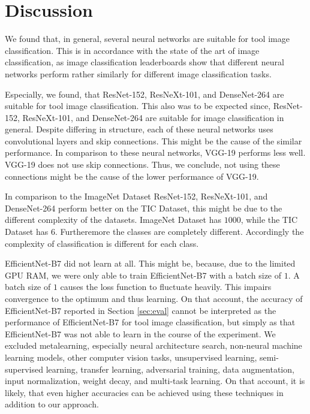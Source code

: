 \documentclass[a4paper, 10pt, journal]{wissarbIEEE}
\begin{document}
\section{Discussion}
\label{sec:discussion}
We found that, in general, several neural networks are suitable for tool image classification. This is in accordance with the state of the art of image classification, as image classification leaderboards show that different neural networks perform rather similarly for different image classification tasks. \cite{imagenet.2019, cifar.2012, mnist.2010, svhn.2011, stl.2011, clothing.2016, fashionMNIST.2017, Darlow.2018, flowers.2008, food.2014, vanHorn.2018, stanfordcars.2013, emnistletters.2017, kuzushijiMNIST.2018, cub.2011, Sabour.2017, isic1.2019, isic2.2018, isic3.2018}
\par
Especially, we found, that ResNet-152, ResNeXt-101, and DenseNet-264 are suitable for tool image classification. This also was to be expected since, ResNet-152, ResNeXt-101, and DenseNet-264 are suitable for image classification in general. \cite{Xie.2017, He.2016, Huang.2017} Despite differing in structure, each of these neural networks uses convolutional layers and skip connections. \cite{Xie.2017, He.2016, Huang.2017} This might be the cause of the similar performance. In comparison to these neural networks, VGG-19 performs less well. VGG-19 does not use skip connections. \cite{Simonyan.2014} Thus, we conclude, not using these connections might be the cause of the lower performance of VGG-19.
\par
In comparison to the ImageNet Dataset ResNet-152, ResNeXt-101, and DenseNet-264 perform better on the TIC Dataset, this might be due to the different complexity of the datasets. ImageNet Dataset has $1000$, while the TIC Dataset has $6$. Furtheremore the classes are completely different. Accordingly the complexity of classification is different for each class.
\par
EfficientNet-B7 did not learn at all. This might be, because, due to the limited GPU RAM, we were only able to train EfficientNet-B7 with a batch size of $1$. A batch size of $1$ causes the loss function to fluctuate heavily. This impairs convergence to the optimum and thus learning. On that account, the accuracy of EfficientNet-B7 reported in Section \ref{sec:eval} cannot be interpreted as the performance of EfficientNet-B7 for tool image classification, but simply as that EfficientNet-B7 was not able to learn in the course of the experiment.
We excluded metalearning, especially neural architecture search, non-neural machine learning models, other computer vision tasks, unsupervised learning, semi-supervised learning, transfer learning, adversarial training, data augmentation, input normalization, weight decay, and multi-task learning. On that account, it is likely, that even higher accuracies can be achieved using these techniques in addition to our approach.
\end{document}
